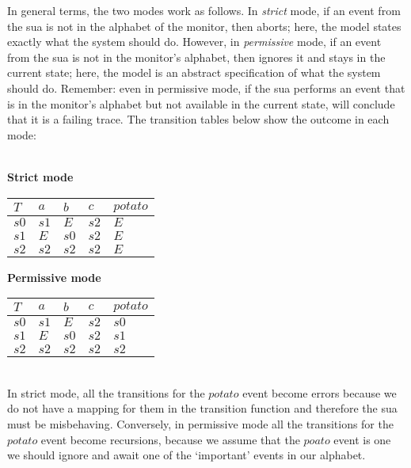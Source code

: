 \documentclass[12pt,a4paper]{article}
\begin{document}
In general terms, the two modes work as follows.
In \textit{strict} mode, if an event from the \gls{sua} is not in the alphabet of the monitor, then \Varanus aborts; here, the model states exactly what the system should do. However, in \textit{permissive} mode, if an event from the \gls{sua} is not in the monitor's alphabet, then \Varanus ignores it and stays in the current state; here, the model is an abstract specification of what the system should do. Remember: even in permissive mode, if the \gls{sua} performs an event that is in the monitor's alphabet but not available in the current state, \Varanus will conclude that it is a failing trace.
The transition tables below show the outcome in each mode:\\
~\\
\begin{minipage}{0.45\textwidth}
\begin{center}
\textbf{Strict mode}
\begin{tabular}{l|l|l|l|l}
$T$  &  $a$ & $b$ & $c$ & $potato$\\
\hline
$s0$ & $s1$ & $E$ & $s2$ & $E$\\
$s1$ & $E$ & $s0$ & $s2$ & $E$\\ 
$s2$ & $s2$ & $s2$ &$s2$ & $E$\\
\end{tabular}
\end{center}
\end{minipage}
\noindent \begin{minipage}{0.45\textwidth}
\begin{center}
\textbf{Permissive mode}
\begin{tabular}{l|l|l|l|l}
$T$  &  $a$ & $b$ & $c$ & $potato$\\
\hline
$s0$ & $s1$ & $E$ & $s2$ & $s0$\\
$s1$ & $E$ & $s0$ & $s2$ & $s1$\\ 
$s2$ & $s2$ & $s2$ &$s2$ & $s2$\\
\end{tabular}
\end{center}
\end{minipage} \\
\noindent In strict mode, all the transitions for the $potato$ event become errors because we do not have a mapping for them in the transition function and therefore the \gls{sua} must be misbehaving. 
Conversely, in permissive mode all the transitions for the $potato$ event become recursions, because we assume that the $poato$ event is one we should ignore and await one of the `important' events in our alphabet.
\end{document}
